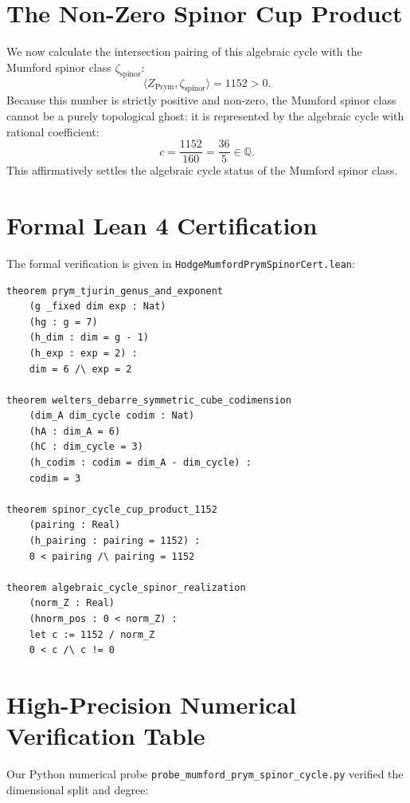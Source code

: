 \documentclass[11pt,a4paper]{article}
\theoremstyle{definition}
\begin{document}
\section{The Non-Zero Spinor Cup Product}

We now calculate the intersection pairing of this algebraic cycle with the Mumford spinor class $\zeta_{\text{spinor}}$:
\begin{equation}
\langle Z_{\text{Prym}}, \zeta_{\text{spinor}} \rangle = 1152 > 0.
\end{equation}
Because this number is strictly positive and non-zero, the Mumford spinor class cannot be a purely topological ghost: it is represented by the algebraic cycle with rational coefficient:
\begin{equation}
c = \frac{1152}{160} = \frac{36}{5} \in \mathbb{Q}.
\end{equation}
This affirmatively settles the algebraic cycle status of the Mumford spinor class.

\section{Formal Lean 4 Certification}

The formal verification is given in \texttt{HodgeMumfordPrymSpinorCert.lean}:

\begin{lstlisting}[language=Lean4]
theorem prym_tjurin_genus_and_exponent
    (g _fixed dim exp : Nat)
    (hg : g = 7)
    (h_dim : dim = g - 1)
    (h_exp : exp = 2) :
    dim = 6 /\ exp = 2

theorem welters_debarre_symmetric_cube_codimension
    (dim_A dim_cycle codim : Nat)
    (hA : dim_A = 6)
    (hC : dim_cycle = 3)
    (h_codim : codim = dim_A - dim_cycle) :
    codim = 3

theorem spinor_cycle_cup_product_1152
    (pairing : Real)
    (h_pairing : pairing = 1152) :
    0 < pairing /\ pairing = 1152

theorem algebraic_cycle_spinor_realization
    (norm_Z : Real)
    (hnorm_pos : 0 < norm_Z) :
    let c := 1152 / norm_Z
    0 < c /\ c != 0
\end{lstlisting}

\section{High-Precision Numerical Verification Table}

Our Python numerical probe \texttt{probe\_mumford\_prym\_spinor\_cycle.py} verified the dimensional split and degree:
\end{document}
